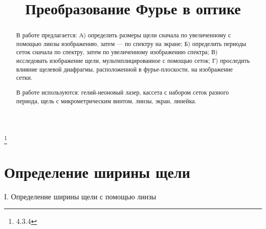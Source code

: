 


\title{Преобразование Фурье в оптике}
\thanks{4.3.4}



\begin{abstract}
В работе предлагается: А) определить размеры щели сначала по увеличенному с помощью линзы изображению, затем — по спектру на экране; Б) определить периоды сеток сначала по спектру, затем по увеличенному изображению спектра; В) исследовать изображение щели,
мультиплицированное с помощью сеток; Г) проследить влияние щелевой диафрагмы, расположенной в фурье-плоскости, на изображение сетки.

В работе используются: гелий-неоновый лазер, кассета с набором сеток разного периода, щель с микрометрическим винтом, линзы, экран, линейка.\\

\end{abstract}

\maketitle


\section{\label{sec:level1}Определение ширины щели}

\begin{center}
I. Определение ширины щели с помощью линзы
\end{center}

